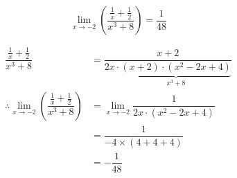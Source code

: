 \documentclass[14pt,fleqn]{extarticle}
\begin{document}
 

\begin{snippet}
    
    \incorrect
    
    \[ \lim_{x\to -2}\left(\dfrac{\frac{1}{x} + \frac{1}{2}}{x^3 + 8}\right) = \dfrac{1}{48}  \]
    
    \reason

\begin{align}
\dfrac{\frac{1}{x} + \frac{1}{2}}{x^3 + 8} &= \dfrac{x+2}{2x\cdot\underbrace{(x+2)\cdot(x^2-2x+4)}_{x^3 + 8}}\\
\therefore  \lim_{x\to -2}\left(\dfrac{\frac{1}{x} + \frac{1}{2}}{x^3 + 8}\right) &= 
\lim_{x\to -2}\dfrac{1}{2x\cdot (x^2-2x+4)} \\
&= \dfrac{1}{-4\times (4 + 4 + 4)} \\
&= -\dfrac{1}{48} 
\end{align}
    
\end{snippet} 
\end{document}
